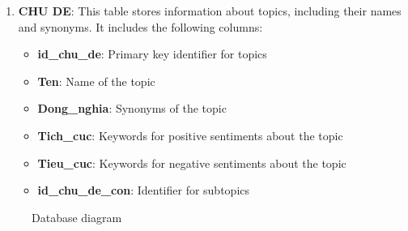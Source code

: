 {\begin{enumerate}
\begin{itemize}
            \item \textbf{Nguon}: Source of the news article
            \item \textbf{Ngay}: Date of publication
            \item \textbf{text}: Text content of the news article
            \item \textbf{url}: URL of the news article
            \item \textbf{url\_hash}: Hash value of the URL
        \end{itemize}
    \item \textbf{CHU DE}: This table stores information about topics, including their names and synonyms. It includes the following columns:
        \begin{itemize}
            \item \textbf{id\_chu\_de}: Primary key identifier for topics
            \item \textbf{Ten}: Name of the topic
            \item \textbf{Dong\_nghia}: Synonyms of the topic
            \item \textbf{Tich\_cuc}: Keywords for positive sentiments about the topic
            \item \textbf{Tieu\_cuc}: Keywords for negative sentiments about the topic
            \item \textbf{id\_chu\_de\_con}: Identifier for subtopics
        \end{itemize}
\end{enumerate}

\begin{figure}[t]
  \begin{center}
  \end{center}
  \caption{\small Database diagram}
\label{fig:er_model}%
\end{figure}

}
